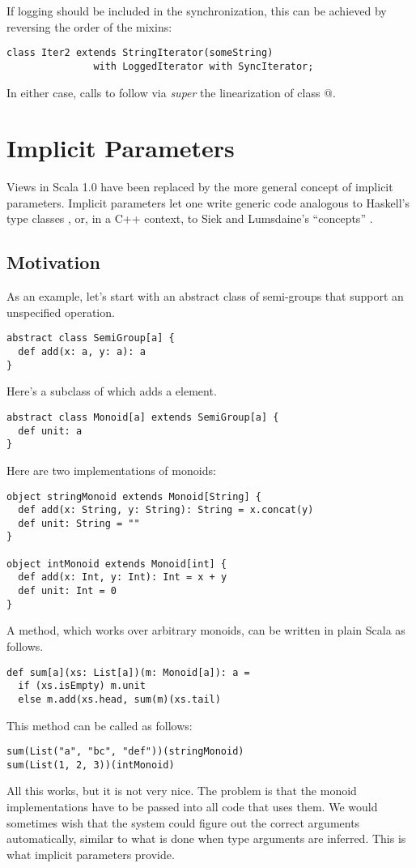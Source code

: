 \documentclass[a4paper,11pt,twoside]{article}
\begin{document}
If logging should be included in the synchronization, this can be
achieved by reversing the order of the mixins:
\begin{lstlisting}
class Iter2 extends StringIterator(someString) 
               with LoggedIterator with SyncIterator;         
\end{lstlisting}
In either case, calls to \lstinline@next@ follow via
{\em super} the linearization of class @.

\section{Implicit Parameters}

Views in Scala 1.0 have been replaced by the more general concept of
implicit parameters. Implicit parameters let one write generic code
analogous to Haskell's type classes \cite{chen-hudak-odersky:parametric-conf},
or, in a C++ context, to Siek and Lumsdaine's ``concepts'' \cite{siek-lumsdaine:pldi05}.

\subsection*{Motivation}

As an example, let's start with an abstract class of semi-groups that
support an unspecified \lstinline@add@ operation.
\begin{lstlisting}
abstract class SemiGroup[a] {
  def add(x: a, y: a): a
}
\end{lstlisting}
Here's a subclass \lstinline@Monoid@ of \lstinline@SemiGroup@ which adds a
\lstinline@unit@ element.
\begin{lstlisting}
abstract class Monoid[a] extends SemiGroup[a] {
  def unit: a
}
\end{lstlisting}
Here are two implementations of monoids:
\begin{lstlisting}
object stringMonoid extends Monoid[String] {
  def add(x: String, y: String): String = x.concat(y)
  def unit: String = ""
}

object intMonoid extends Monoid[int] {
  def add(x: Int, y: Int): Int = x + y
  def unit: Int = 0
}
\end{lstlisting}
A \lstinline@sum@ method, which works over arbitrary
monoids, can be written in plain Scala as follows.
\begin{lstlisting}
def sum[a](xs: List[a])(m: Monoid[a]): a =
  if (xs.isEmpty) m.unit
  else m.add(xs.head, sum(m)(xs.tail)
\end{lstlisting}
This \lstinline@sum@ method can be called as follows:
\begin{lstlisting}
sum(List("a", "bc", "def"))(stringMonoid)
sum(List(1, 2, 3))(intMonoid)
\end{lstlisting}
All this works, but it is not very nice. The problem is that the
monoid implementations have to be passed into all code that uses them.
We would sometimes wish that the system could figure out the correct
arguments automatically, similar to what is done when type arguments
are inferred. This is what implicit parameters provide.
\end{document}
